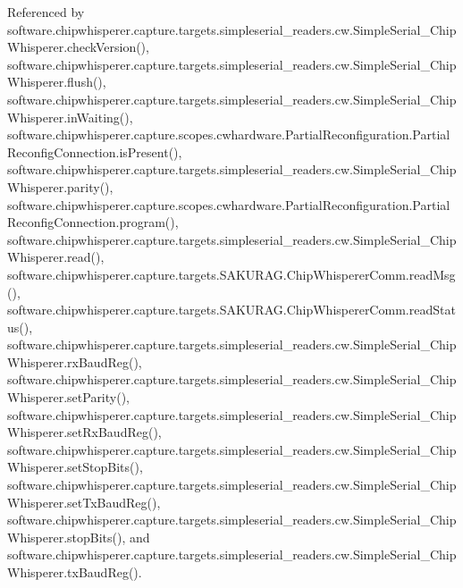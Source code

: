 Referenced by software.\+chipwhisperer.\+capture.\+targets.\+simpleserial\+\_\+readers.\+cw.\+Simple\+Serial\+\_\+\+Chip\+Whisperer.\+check\+Version(), software.\+chipwhisperer.\+capture.\+targets.\+simpleserial\+\_\+readers.\+cw.\+Simple\+Serial\+\_\+\+Chip\+Whisperer.\+flush(), software.\+chipwhisperer.\+capture.\+targets.\+simpleserial\+\_\+readers.\+cw.\+Simple\+Serial\+\_\+\+Chip\+Whisperer.\+in\+Waiting(), software.\+chipwhisperer.\+capture.\+scopes.\+cwhardware.\+Partial\+Reconfiguration.\+Partial\+Reconfig\+Connection.\+is\+Present(), software.\+chipwhisperer.\+capture.\+targets.\+simpleserial\+\_\+readers.\+cw.\+Simple\+Serial\+\_\+\+Chip\+Whisperer.\+parity(), software.\+chipwhisperer.\+capture.\+scopes.\+cwhardware.\+Partial\+Reconfiguration.\+Partial\+Reconfig\+Connection.\+program(), software.\+chipwhisperer.\+capture.\+targets.\+simpleserial\+\_\+readers.\+cw.\+Simple\+Serial\+\_\+\+Chip\+Whisperer.\+read(), software.\+chipwhisperer.\+capture.\+targets.\+S\+A\+K\+U\+R\+A\+G.\+Chip\+Whisperer\+Comm.\+read\+Msg(), software.\+chipwhisperer.\+capture.\+targets.\+S\+A\+K\+U\+R\+A\+G.\+Chip\+Whisperer\+Comm.\+read\+Status(), software.\+chipwhisperer.\+capture.\+targets.\+simpleserial\+\_\+readers.\+cw.\+Simple\+Serial\+\_\+\+Chip\+Whisperer.\+rx\+Baud\+Reg(), software.\+chipwhisperer.\+capture.\+targets.\+simpleserial\+\_\+readers.\+cw.\+Simple\+Serial\+\_\+\+Chip\+Whisperer.\+set\+Parity(), software.\+chipwhisperer.\+capture.\+targets.\+simpleserial\+\_\+readers.\+cw.\+Simple\+Serial\+\_\+\+Chip\+Whisperer.\+set\+Rx\+Baud\+Reg(), software.\+chipwhisperer.\+capture.\+targets.\+simpleserial\+\_\+readers.\+cw.\+Simple\+Serial\+\_\+\+Chip\+Whisperer.\+set\+Stop\+Bits(), software.\+chipwhisperer.\+capture.\+targets.\+simpleserial\+\_\+readers.\+cw.\+Simple\+Serial\+\_\+\+Chip\+Whisperer.\+set\+Tx\+Baud\+Reg(), software.\+chipwhisperer.\+capture.\+targets.\+simpleserial\+\_\+readers.\+cw.\+Simple\+Serial\+\_\+\+Chip\+Whisperer.\+stop\+Bits(), and software.\+chipwhisperer.\+capture.\+targets.\+simpleserial\+\_\+readers.\+cw.\+Simple\+Serial\+\_\+\+Chip\+Whisperer.\+tx\+Baud\+Reg().

\hypertarget{classsoftware_1_1chipwhisperer_1_1capture_1_1scopes_1_1cwhardware_1_1PartialReconfiguration_1_1PartialReconfigConnection_a6bab5f476e2cc0a0237b6973bcb6713d}{}
